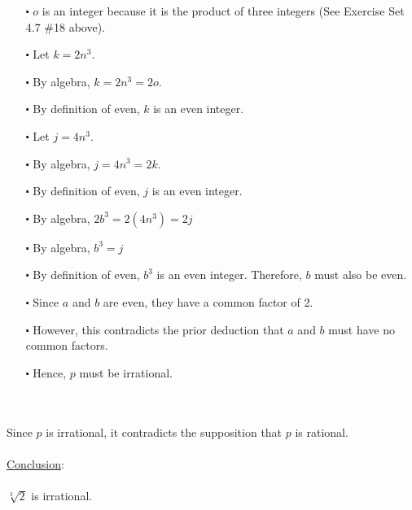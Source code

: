 \documentclass[12pt]{article}
\begin{document}
\begin{itemize}
  \item [$\centerdot$] $o$ is an integer because it is the product of three integers (See Exercise Set 4.7 \#18  above).
  \item [$\centerdot$] Let $k = 2n^3$.
  \item [$\centerdot$] By algebra, $k = 2n^3 = 2o$.
  \item [$\centerdot$] By definition of even, $k$ is an even integer.
  \item [$\centerdot$] Let $j = 4n^3$.
  \item [$\centerdot$] By algebra, $j = 4n^3 = 2k$.
  \item [$\centerdot$] By definition of even, $j$ is an even integer.
  \item [$\centerdot$] By algebra, $2b^3 = 2(4n^3) = 2j$ 
  \item [$\centerdot$] By algebra, $b^3 = j$
  \item [$\centerdot$] By definition of even, $b^3$ is an even integer. Therefore, $b$ must also be even.
  \item [$\centerdot$] Since $a$ and $b$ are even, they have a common factor of 2.
  \item [$\centerdot$] However, this contradicts the prior deduction that $a$ and $b$ must have no common factors.
  \item [$\centerdot$] Hence, $p$ must be irrational.
\end{itemize}
\newblock
\\ \\
Since $p$ is irrational, it contradicts the supposition that $p$ is rational.
\\ \\
\underline{Conclusion}:
\\ \\
$\sqrt[3]{2}$ is irrational.
\end{document}
